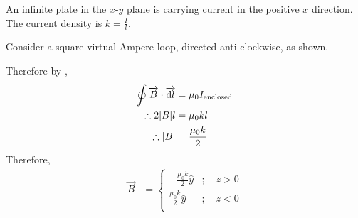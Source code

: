 \documentclass[fleqn, a4paper, 12pt, twoside]{article}
\theoremstyle{definition}
\theoremstyle{theorem}
\begin{document}
\begin{question}
	An infinite plate in the $x$-$y$ plane is carrying current in the positive $x$ direction.
	The current density is $k = \frac{I}{l}$.
\end{question}

\begin{solution}
	Consider a square virtual Ampere loop, directed anti-clockwise, as shown.
	\begin{figure}[H]
	\end{figure}
	Therefore by ,
	\begin{align*}
		\oint \overrightarrow{B} \cdot \overrightarrow{\dif l} &= \mu_0 I_{\textnormal{enclosed}}\\
		\therefore 2 |B| l &= \mu_0 k l\\
		\therefore |B| &= \frac{\mu_0 k}{2}
	\end{align*}
	Therefore,
	\begin{align*}
		\overrightarrow{B} &=
			\begin{cases}
				-\frac{\mu_0 k}{2} \hat{y} & ;\quad z > 0 \\
				\frac{\mu_0 k}{2} \hat{y}  & ;\quad z < 0 \\
			\end{cases}
	\end{align*}
\end{solution}
\end{document}
